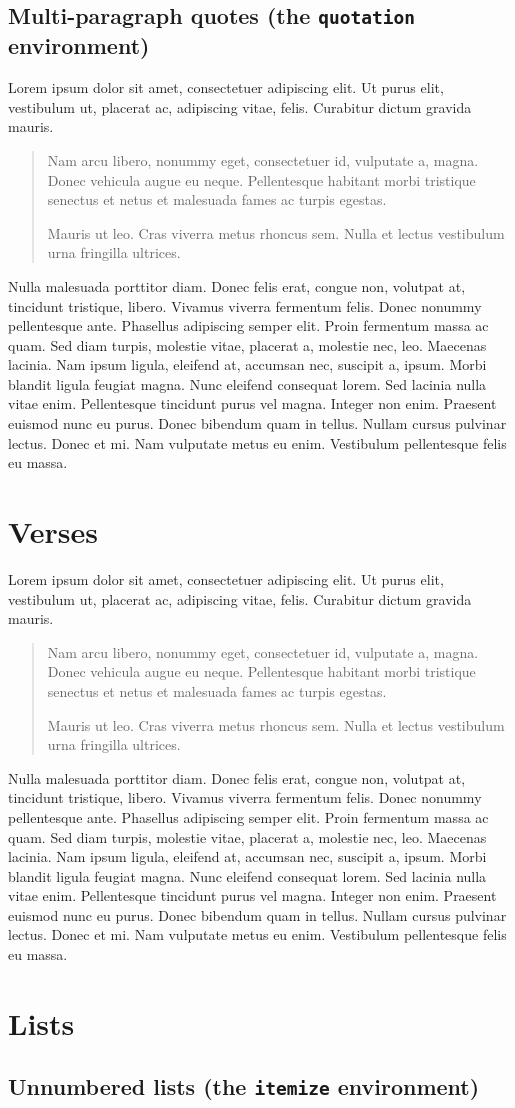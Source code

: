 \documentclass[draft*,nochapters]{aaltoseries}
\newcommand{\lipsum}{%
Nulla malesuada porttitor diam. Donec felis erat, congue non, volutpat at, tincidunt tristique, libero. Vivamus viverra fermentum felis. Donec nonummy pellentesque ante. Phasellus adipiscing semper elit. Proin fermentum massa ac quam. Sed diam turpis, molestie vitae, placerat a, molestie nec, leo. Maecenas lacinia. Nam ipsum ligula, eleifend at, accumsan nec, suscipit a, ipsum. Morbi blandit ligula feugiat magna. Nunc eleifend consequat lorem. Sed lacinia nulla vitae enim. Pellentesque tincidunt purus vel magna. Integer non enim. Praesent euismod nunc eu purus. Donec bibendum quam in tellus. Nullam cursus pulvinar lectus. Donec et mi. Nam vulputate metus eu enim. Vestibulum pellentesque felis eu massa.
}
\begin{document}
\subsection{Multi-paragraph quotes (the \texttt{quotation} environment)}

Lorem ipsum dolor sit amet, consectetuer adipiscing elit. Ut purus elit, vestibulum ut, placerat ac, adipiscing vitae, felis. Curabitur dictum gravida mauris.
\begin{quotation}
Nam arcu libero, nonummy eget, consectetuer id, vulputate a, magna. Donec vehicula augue eu neque. Pellentesque habitant morbi tristique senectus et netus et malesuada fames ac turpis egestas.

Mauris ut leo. Cras viverra metus rhoncus sem. Nulla et lectus vestibulum urna fringilla ultrices.
\end{quotation}
\lipsum

\section{Verses}

Lorem ipsum dolor sit amet, consectetuer adipiscing elit. Ut purus elit,  vestibulum ut, placerat ac, adipiscing vitae, felis. Curabitur dictum gravida mauris.
\begin{verse}
Nam arcu libero, nonummy eget, consectetuer id, vulputate a, magna. Donec vehicula augue eu neque. Pellentesque habitant morbi tristique senectus et netus et malesuada fames ac turpis egestas.

Mauris ut leo. Cras viverra metus rhoncus sem. Nulla et lectus vestibulum urna fringilla ultrices.
\end{verse}
\lipsum

\section{Lists}

\subsection{Unnumbered lists (the \texttt{itemize} environment)}
\end{document}
